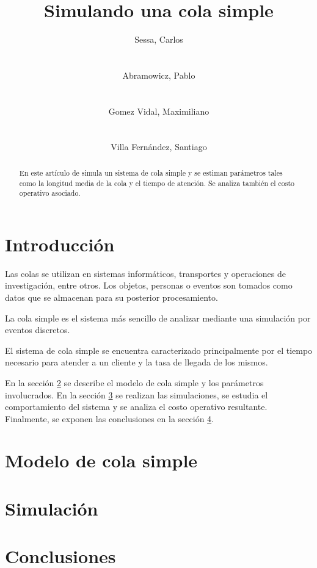 \documentclass{sig-alternate}
\begin{document}
\title{Simulando una cola simple}


\author{
    \alignauthor
    Sessa, Carlos\\
     \\
    \ \\
    Abramowicz, Pablo\\
     \\
    \ \\
    \alignauthor
    Gomez Vidal, Maximiliano\\
     \\
    \ \\
    Villa Fern\'{a}ndez, Santiago\\
}

\maketitle

\begin{abstract}
En este art\'{i}culo de simula un sistema de cola simple y se estiman
par\'{a}metros tales como la longitud media de la cola y el tiempo de
atenci\'{o}n. Se analiza tambi\'{e}n el costo operativo asociado.
\end{abstract}


\section{Introducci\'{o}n}\label{introduccion}

Las colas se utilizan en sistemas inform\'{a}ticos, transportes y operaciones 
de investigaci\'{o}n, entre otros. Los objetos, personas o eventos son tomados 
como datos que se almacenan para su posterior procesamiento.

La cola simple es el sistema m\'{a}s sencillo de analizar mediante una
simulaci\'{o}n por eventos discretos.

El sistema de cola simple se encuentra caracterizado principalmente por el 
tiempo necesario para atender a un cliente y la tasa de llegada de los mismos.

En la secci\'{o}n \ref{modelo} se describe el modelo de cola simple y los
par\'{a}metros involucrados. En la secci\'{o}n \ref{simulacion} se realizan
las simulaciones, se estudia el comportamiento del sistema y se analiza
el costo operativo resultante. Finalmente, se exponen las conclusiones en 
la secci\'{o}n \ref{conclusiones}.

\section{Modelo de cola simple}\label{modelo}

\section{Simulaci\'{o}n}\label{simulacion}

\section{Conclusiones}\label{conclusiones}
\end{document}
